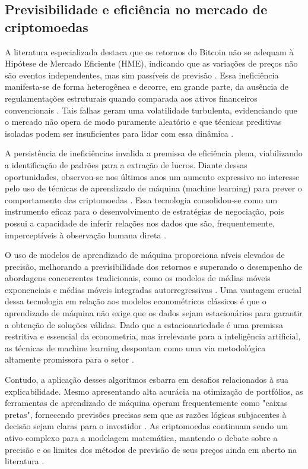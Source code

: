\subsection{Previsibilidade e eficiência no mercado de criptomoedas}
\label{subsec_previsibilidade_e_eficiencia_no_mercado_de_criptomoedas}

A literatura especializada destaca que os retornos do Bitcoin não se adequam à Hipótese de Mercado Eficiente (HME), indicando que as variações de preços não são eventos independentes, mas sim passíveis de previsão \cite{fakhfekh2020volatility}. Essa ineficiência manifesta-se de forma heterogênea e decorre, em grande parte, da ausência de regulamentações estruturais quando comparada aos ativos financeiros convencionais \cite{park2023intelligent}. Tais falhas geram uma volatilidade turbulenta, evidenciando que o mercado não opera de modo puramente aleatório e que técnicas preditivas isoladas podem ser insuficientes para lidar com essa dinâmica \cite{park2023intelligent}.

A persistência de ineficiências invalida a premissa de eficiência plena, viabilizando a identificação de padrões para a extração de lucros. Diante dessas oportunidades, observou-se nos últimos anos um aumento expressivo no interesse pelo uso de técnicas de aprendizado de máquina (machine learning) para prever o comportamento das criptomoedas \cite{sebastiao2021forecasting}. Essa tecnologia consolidou-se como um instrumento eficaz para o desenvolvimento de estratégias de negociação, pois possui a capacidade de inferir relações nos dados que são, frequentemente, imperceptíveis à observação humana direta \cite{fang2022cryptocurrency}.

O uso de modelos de aprendizado de máquina proporciona níveis elevados de precisão, melhorando a previsibilidade dos retornos e superando o desempenho de abordagens concorrentes tradicionais, como os modelos de médias móveis exponenciais e médias móveis integradas autorregressivas \cite{sebastiao2021forecasting}. Uma vantagem crucial dessa tecnologia em relação aos modelos econométricos clássicos é que o aprendizado de máquina não exige que os dados sejam estacionários para garantir a obtenção de soluções válidas. Dado que a estacionariedade é uma premissa restritiva e essencial da econometria, mas irrelevante para a inteligência artificial, as técnicas de machine learning despontam como uma via metodológica altamente promissora para o setor \cite{chevallier2021forecast}.

Contudo, a aplicação desses algoritmos esbarra em desafios relacionados à sua explicabilidade. Mesmo apresentando alta acurácia na otimização de portfólios, as ferramentas de aprendizado de máquina operam frequentemente como "caixas pretas", fornecendo previsões precisas sem que as razões lógicas subjacentes à decisão sejam claras para o investidor \cite{babaei2022explainable}. As criptomoedas continuam sendo um ativo complexo para a modelagem matemática, mantendo o debate sobre a precisão e os limites dos métodos de previsão de seus preços ainda em aberto na literatura \cite{chevallier2021forecast}.

